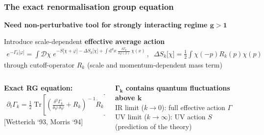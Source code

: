 \documentclass[]{beamer}  %
\begin{document}
\fontsize{8pt}{7.2}\selectfont
\begin{frame}
  \frametitle{The exact renormalisation group equation}

  \begin{center}
    \textbf{
      Need non-perturbative tool for strongly interacting regime $\mathbf{g>1}$
    }
  \end{center}

  Introduce scale-dependent \textbf{effective average action}
  \begin{align*}
    e^{ - \Gamma_k \lbrack \varphi \rbrack }
    = \int \mathcal D \chi \;
    e^{
      - S \lbrack \chi + \varphi \rbrack
      - \Delta S_k \lbrack \chi \rbrack
      + \int \mathrm d^dx \;
      \frac{ \delta \Gamma_k }{ \delta \varphi (x) }
      \, \chi(x)
    } \,, \;\;
   \Delta S_k \lbrack \chi \rbrack =
   \frac 12 \int \chi(-p) R_k(p) \chi(p)
  \end{align*}
  through cutoff-operator $R_k$ (scale and momentum-dependent mass term)

  \vspace{30pt}
  \begin{columns}[T]
    \begin{column}{.5\textwidth}
      \textbf{Exact RG equation:}\\[3pt]
      \begin{align*}
        \boxed{
          \partial_t \Gamma_k
          = \frac 12 \; \mathrm{Tr}
          \left[
            \left(
              \frac{ \delta^2 \Gamma_k }{ \delta \varphi \, \delta \varphi } + R_k
            \right) ^{\!\!-1}
            \! \dot R_k
          \right]
        }
      \end{align*}
      \hfill [Wetterich `93, Morris `94]
    \end{column}
    \begin{column}{.5\textwidth}
      \textbf{
        $\mathbf{\Gamma_k}$ contains quantum fluctuations above $\mathbf{k}$
      }\\[10pt]

      IR limit ($k \rightarrow 0$): full effective action $\Gamma$\\[5pt]
      UV limit ($k \rightarrow \infty$): UV action $S$\\
      \hfill (prediction of the theory)
    \end{column}
  \end{columns}
\end{frame}

\end{document}
